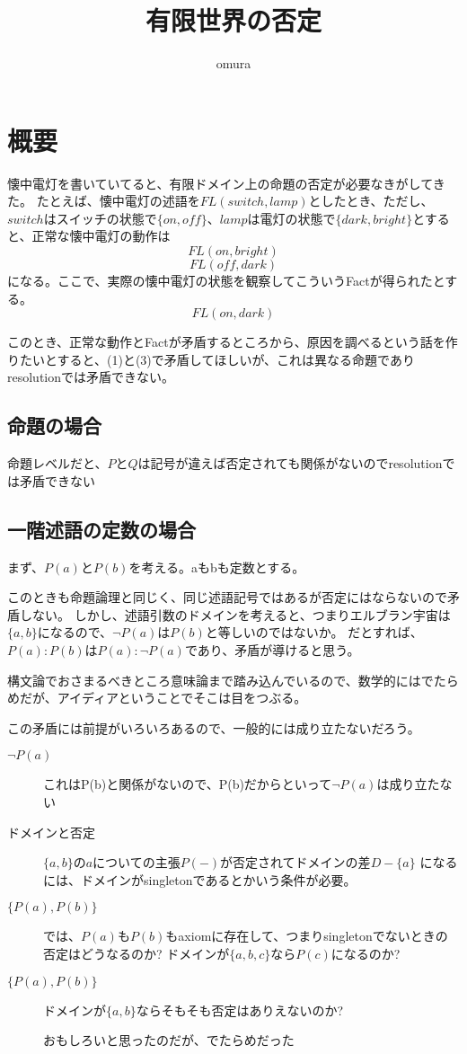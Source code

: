 \documentclass[10pt, oneside]{jarticle}   	%
\title{有限世界の否定}
\author{omura}
\theoremstyle{definition}
\begin{document}
\maketitle

\section{概要}
懐中電灯を書いていてると、有限ドメイン上の命題の否定が必要なきがしてきた。
たとえば、懐中電灯の述語を$FL(switch, lamp)$としたとき、ただし、$switchはスイッチの状態で\{on,off\}、lampは電灯の状態で\{dark, bright\}$とすると、正常な懐中電灯の動作は
\begin{equation}
FL(on, bright)
\end{equation}
\begin{equation}
FL(off, dark)
\end{equation}
になる。ここで、実際の懐中電灯の状態を観察してこういうFactが得られたとする。
\begin{equation}
FL(on, dark)
\end{equation}

このとき、正常な動作とFactが矛盾するところから、原因を調べるという話を作りたいとすると、(1)と(3)で矛盾してほしいが、これは異なる命題でありresolutionでは矛盾できない。

\subsection{命題の場合}
命題レベルだと、$P$と$Q$は記号が違えば否定されても関係がないのでresolutionでは矛盾できない

\subsection{一階述語の定数の場合}
まず、$P(a)$と$P(b)$を考える。aもbも定数とする。

このときも命題論理と同じく、同じ述語記号ではあるが否定にはならないので矛盾しない。
しかし、述語引数のドメインを考えると、つまりエルブラン宇宙は$\{a,b\}$になるので、$\neg P(a)$は$P(b)$と等しいのではないか。
だとすれば、$P(a) : P(b)$は$P(a) : \neg P(a)$であり、矛盾が導けると思う。

構文論でおさまるべきところ意味論まで踏み込んでいるので、数学的にはでたらめだが、アイディアということでそこは目をつぶる。

この矛盾には前提がいろいろあるので、一般的には成り立たないだろう。
\begin{description}
\item[ $\neg P(a)$] これはP(b)と関係がないので、P(b)だからといって$\neg P(a)$は成り立たない
\item[ ドメインと否定] $\{a,b\}$の$a$についての主張$P(-)$が否定されてドメインの差$D-\{a\}$ になるには、ドメインがsingletonであるとかいう条件が必要。
\item[ $\{P(a), P(b)\}$] では、$P(a)$も$P(b)$もaxiomに存在して、つまりsingletonでないときの否定はどうなるのか? ドメインが$\{a,b,c\}$なら$P(c)$になるのか? 
\item[ $\{P(a), P(b)\}$] ドメインが$\{a,b\}$ならそもそも否定はありえないのか?

おもしろいと思ったのだが、でたらめだった

\end{description}
\end{document}
